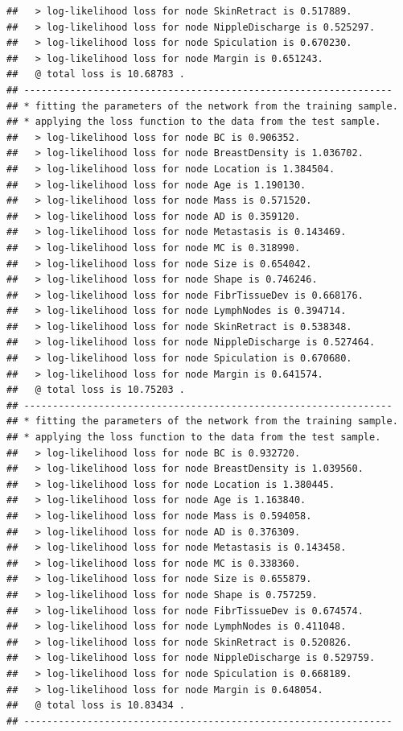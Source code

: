 \documentclass[]{article}
\begin{document}
\begin{verbatim}
##   > log-likelihood loss for node SkinRetract is 0.517889.
##   > log-likelihood loss for node NippleDischarge is 0.525297.
##   > log-likelihood loss for node Spiculation is 0.670230.
##   > log-likelihood loss for node Margin is 0.651243.
##   @ total loss is 10.68783 .
## ----------------------------------------------------------------
## * fitting the parameters of the network from the training sample.
## * applying the loss function to the data from the test sample.
##   > log-likelihood loss for node BC is 0.906352.
##   > log-likelihood loss for node BreastDensity is 1.036702.
##   > log-likelihood loss for node Location is 1.384504.
##   > log-likelihood loss for node Age is 1.190130.
##   > log-likelihood loss for node Mass is 0.571520.
##   > log-likelihood loss for node AD is 0.359120.
##   > log-likelihood loss for node Metastasis is 0.143469.
##   > log-likelihood loss for node MC is 0.318990.
##   > log-likelihood loss for node Size is 0.654042.
##   > log-likelihood loss for node Shape is 0.746246.
##   > log-likelihood loss for node FibrTissueDev is 0.668176.
##   > log-likelihood loss for node LymphNodes is 0.394714.
##   > log-likelihood loss for node SkinRetract is 0.538348.
##   > log-likelihood loss for node NippleDischarge is 0.527464.
##   > log-likelihood loss for node Spiculation is 0.670680.
##   > log-likelihood loss for node Margin is 0.641574.
##   @ total loss is 10.75203 .
## ----------------------------------------------------------------
## * fitting the parameters of the network from the training sample.
## * applying the loss function to the data from the test sample.
##   > log-likelihood loss for node BC is 0.932720.
##   > log-likelihood loss for node BreastDensity is 1.039560.
##   > log-likelihood loss for node Location is 1.380445.
##   > log-likelihood loss for node Age is 1.163840.
##   > log-likelihood loss for node Mass is 0.594058.
##   > log-likelihood loss for node AD is 0.376309.
##   > log-likelihood loss for node Metastasis is 0.143458.
##   > log-likelihood loss for node MC is 0.338360.
##   > log-likelihood loss for node Size is 0.655879.
##   > log-likelihood loss for node Shape is 0.757259.
##   > log-likelihood loss for node FibrTissueDev is 0.674574.
##   > log-likelihood loss for node LymphNodes is 0.411048.
##   > log-likelihood loss for node SkinRetract is 0.520826.
##   > log-likelihood loss for node NippleDischarge is 0.529759.
##   > log-likelihood loss for node Spiculation is 0.668189.
##   > log-likelihood loss for node Margin is 0.648054.
##   @ total loss is 10.83434 .
## ----------------------------------------------------------------

\end{verbatim}
\end{document}
